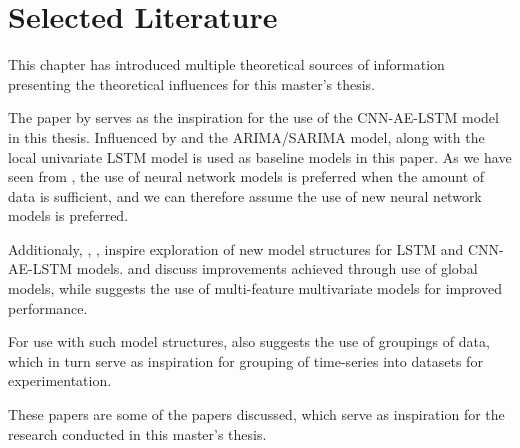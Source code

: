 
\section{Selected Literature}

This chapter has introduced multiple theoretical sources of information
presenting the theoretical influences for this master's thesis.

The paper by \cite{Zhao2019} serves as the inspiration for the use of the CNN-AE-LSTM model
in this thesis.
Influenced by \cite{Zhao2019} and \cite{Cerqueira2019} the ARIMA/SARIMA model, along with the local univariate LSTM model
is used as baseline models in this paper.
As we have seen from \cite{Cerqueira2019}, the use of neural network models is preferred when the amount of data is sufficient,
and we can therefore assume the use of new neural network models is preferred.

Additionaly, \cite{Montero-Manso2021}, \cite{Bandara2017}, \cite{Laptev} inspire exploration of new model structures for
LSTM and CNN-AE-LSTM models.
\cite{Montero-Manso2021} and \cite{Bandara2017} discuss improvements achieved through use of global models,
while \cite{Laptev} suggests the use of multi-feature multivariate models for improved performance.

For use with such model structures, \cite{Bandara2017} also suggests the use of groupings of data,
which in turn serve as inspiration for grouping of time-series into datasets for experimentation.

These papers are some of the papers discussed, which serve as inspiration for the research conducted in this master's thesis.



















